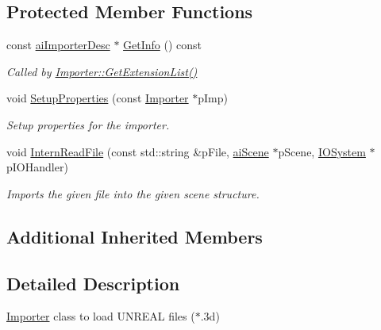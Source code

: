 \subsection*{Protected Member Functions}
\begin{DoxyCompactItemize}
\item 
const \hyperlink{structai_importer_desc}{ai\+Importer\+Desc} $\ast$ \hyperlink{class_assimp_1_1_unreal_importer_abdaca78b5edda1b9f1185928d57c2563}{Get\+Info} () const 
\begin{DoxyCompactList}\small\item\em Called by \hyperlink{class_assimp_1_1_importer_a8efc173c66857384ecb05ec1ecde9780}{Importer\+::\+Get\+Extension\+List()} \end{DoxyCompactList}\item 
void \hyperlink{class_assimp_1_1_unreal_importer_a6245271b643c4beac61819f6cb6291e2}{Setup\+Properties} (const \hyperlink{class_assimp_1_1_importer}{Importer} $\ast$p\+Imp)
\begin{DoxyCompactList}\small\item\em Setup properties for the importer. \end{DoxyCompactList}\item 
void \hyperlink{class_assimp_1_1_unreal_importer_a76e6e77e39a461137453bcbbb22ba71f}{Intern\+Read\+File} (const std\+::string \&p\+File, \hyperlink{structai_scene}{ai\+Scene} $\ast$p\+Scene, \hyperlink{class_assimp_1_1_i_o_system}{I\+O\+System} $\ast$p\+I\+O\+Handler)
\begin{DoxyCompactList}\small\item\em Imports the given file into the given scene structure. \end{DoxyCompactList}\end{DoxyCompactItemize}
\subsection*{Additional Inherited Members}


\subsection{Detailed Description}
\hyperlink{class_assimp_1_1_importer}{Importer} class to load U\+N\+R\+E\+A\+L files ($\ast$.3d) 

